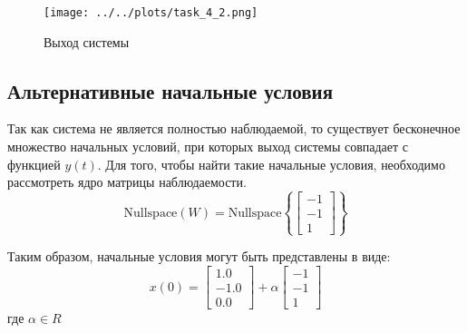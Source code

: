 \begin{figure}[H]
    \centering
    \texttt{[image: ../../plots/task\_4\_2.png]}
    \caption{Выход системы}
    \label{fig:task4_output}
\end{figure}

\subsection{Альтернативные начальные условия} 
Так как система не является полностью наблюдаемой, то существует бесконечное множество начальных условий,
при которых выход системы совпадает с функцией $y(t)$. Для того, чтобы найти такие начальные условия, необходимо
рассмотреть ядро матрицы наблюдаемости.
\begin{equation}
    \text{Nullspace}(W) =  \text{Nullspace}\left\{\begin{bmatrix}
        -1 \\ -1 \\ 1
    \end{bmatrix}  \right\}
\end{equation}

Таким образом, начальные условия могут быть представлены в виде: 
\begin{equation}
    x(0) = \begin{bmatrix}
        1.0 \\ -1.0 \\ 0.0
    \end{bmatrix} + \alpha \begin{bmatrix}
        -1 \\ -1 \\ 1
    \end{bmatrix}
\end{equation}
где $\alpha \in R$

